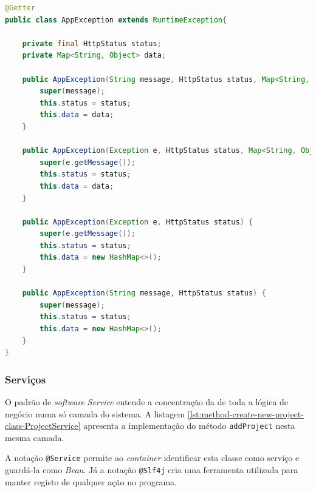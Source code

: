 \begin{lstlisting}[language=Java, caption={Exceção \textit{AppException}}, label={AppException}]
@Getter
public class AppException extends RuntimeException{

    private final HttpStatus status;
    private Map<String, Object> data;

    public AppException(String message, HttpStatus status, Map<String, Object> data) {
        super(message);
        this.status = status;
        this.data = data;
    }

    public AppException(Exception e, HttpStatus status, Map<String, Object> data) {
        super(e.getMessage());
        this.status = status;
        this.data = data;
    }

    public AppException(Exception e, HttpStatus status) {
        super(e.getMessage());
        this.status = status;
        this.data = new HashMap<>();
    }

    public AppException(String message, HttpStatus status) {
        super(message);
        this.status = status;
        this.data = new HashMap<>();
    }
}
\end{lstlisting}







\subsubsection{Serviços}

O padrão de \textit{software} \textit{Service} entende a concentração da de toda a lógica de negócio numa só camada do sistema. A listagem \ref{lst:method-create-new-project-class-ProjectService} apresenta a implementação do método \lstinline|addProject| nesta mesma camada.

A notação \lstinline|@Service| permite ao  \textit{container} identificar esta classe como serviço e guardá-la como \textit{Bean}. Já a notação \lstinline|@Slf4j| cria uma ferramenta utilizada para manter registo de qualquer ação no programa. 

